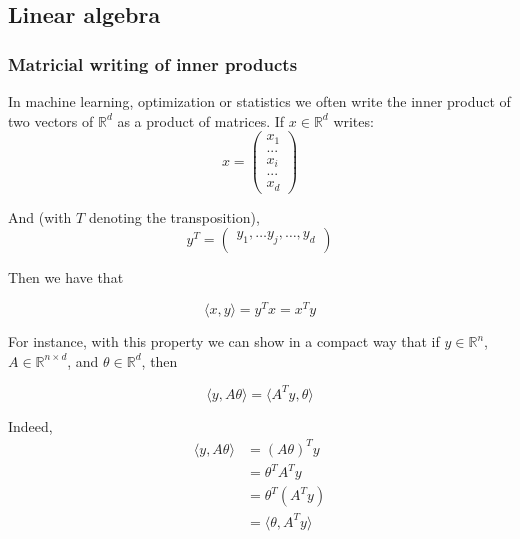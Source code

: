 \documentclass[
10pt, %
a4paper, %
oneside, %
headinclude,footinclude, %
BCOR5mm, %
]{scrartcl}
\begin{document}
\subsection{\large\color{MidnightBlue}Linear algebra}

\subsubsection{\large\color{Periwinkle}Matricial writing of inner products}
\label{ssec:linalg}

In machine learning, optimization or statistics we often write the inner product of two vectors of $ \mathbb{R}^d$ as a product of matrices. If $x\in \mathbb{R}^d$ writes:
\begin{equation*}
x=\begin{pmatrix}
x_{1}\\
...\\
x_{i}\\
...\\
x_{d}
\end{pmatrix}
\end{equation*}

And (with $T$ denoting the transposition),
\begin{equation*}
y^T=\begin{pmatrix}
y_{1}, \dots y_j, \dots, y_d\\
\end{pmatrix}
\end{equation*}

Then we have that

\begin{equation*}
    \langle x, y \rangle = y^Tx=x^Ty
\end{equation*}

For instance, with this property we can show in a compact way that if $y\in \mathbb{R}^n$, $A\in \mathbb{R}^{n\times d}$, and $\theta\in \mathbb{R}^d$, then

\begin{equation*}
    \langle y, A\theta\rangle = \langle A^Ty, \theta\rangle
\end{equation*}

Indeed, 
\begin{equation*}
    \begin{aligned}
	\langle y, A\theta\rangle &= (A\theta)^Ty\\
	&= \theta^TA^Ty\\
	&=\theta^T(A^Ty)\\
	&=\langle \theta, A^Ty\rangle
    \end{aligned}
\end{equation*}
\end{document}
